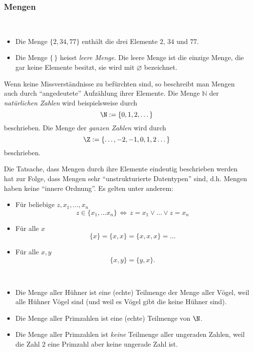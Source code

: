 \subsubsection{Mengen}

\begin{example}~
\begin{itemize}
\item Die Menge $\{2,34,77\}$ enthält die drei Elemente $2$, $34$ und $77$.
\item Die Menge $\{\,\}$ heisst \textit{leere Menge}. Die leere Menge ist die einzige Menge, die gar keine Elemente besitzt, sie wird mit $\varnothing $ bezeichnet.
\end{itemize}
\end{example}

\begin{remark}
Wenn keine Missverständnisse zu befürchten sind, so beschreibt man Mengen auch durch ``angedeutete'' Aufzählung ihrer Elemente. Die Menge $\mathbb{N}$ der \textit{natürlichen Zahlen} wird beispielsweise durch
\[
\N:=\{0,1,2,\dots\}
\]
beschrieben. 
Die Menge der \textit{ganzen Zahlen} wird durch
\[
\Z:=\{\dots, -2,-1,0,1,2\dots\}
\]
beschrieben.
\end{remark}


\begin{remark}
Die Tatsache, dass Mengen durch ihre Elemente eindeutig beschrieben werden hat zur Folge, dass Mengen sehr ``unstrukturierte Datentypen'' sind, d.h. Mengen haben keine ``innere Ordnung''. Es gelten unter anderem:
\begin{itemize}
\item Für beliebige $z,x_1,\dots,x_n$
\[
z\in\{x_1,\dots x_n\}\,\Leftrightarrow\, z=x_1\lor\dots\lor z=x_n
\]
\item Für alle $x$
\[
\{x\}=\{x,x\}=\{x,x,x\}=\dots
\]
\item Für alle $x,y$
\[
\{x,y\}=\{y,x\}.
\]
\end{itemize}
\end{remark}

\begin{example}~
\begin{itemize}
\item Die Menge aller Hühner ist eine (echte) Teilmenge der Menge aller Vögel, weil alle Hühner Vögel sind (und weil es Vögel gibt die keine Hühner sind).
\item Die Menge aller Primzahlen ist eine (echte) Teilmenge von $\N$.
\item Die Menge aller Primzahlen ist \textit{keine} Teilmenge aller ungeraden Zahlen, weil die Zahl $2$ eine Primzahl aber keine ungerade Zahl ist.
\end{itemize}
\end{example}

